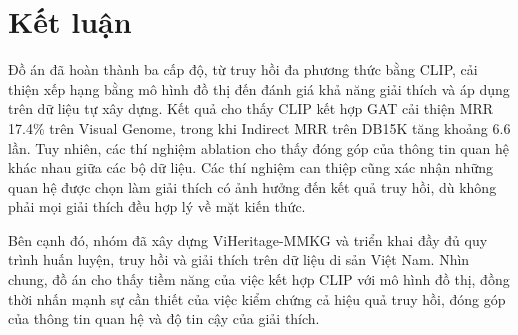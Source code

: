 
\chapter{Kết luận}
\label{chap:conclusion}

Đồ án đã hoàn thành ba cấp độ, từ truy hồi đa phương thức bằng CLIP, cải thiện xếp hạng bằng mô hình đồ thị đến đánh giá khả năng giải thích và áp dụng trên dữ liệu tự xây dựng. Kết quả cho thấy CLIP kết hợp GAT cải thiện MRR 17.4\% trên Visual Genome, trong khi Indirect MRR trên DB15K tăng khoảng 6.6 lần. Tuy nhiên, các thí nghiệm ablation cho thấy đóng góp của thông tin quan hệ khác nhau giữa các bộ dữ liệu. Các thí nghiệm can thiệp cũng xác nhận những quan hệ được chọn làm giải thích có ảnh hưởng đến kết quả truy hồi, dù không phải mọi giải thích đều hợp lý về mặt kiến thức.

Bên cạnh đó, nhóm đã xây dựng ViHeritage-MMKG và triển khai đầy đủ quy trình huấn luyện, truy hồi và giải thích trên dữ liệu di sản Việt Nam. Nhìn chung, đồ án cho thấy tiềm năng của việc kết hợp CLIP với mô hình đồ thị, đồng thời nhấn mạnh sự cần thiết của việc kiểm chứng cả hiệu quả truy hồi, đóng góp của thông tin quan hệ và độ tin cậy của giải thích.
